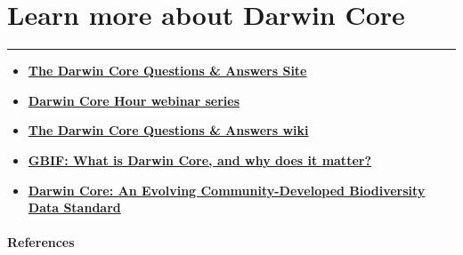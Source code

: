 \documentclass[]{book}
\theoremstyle{definition}
\theoremstyle{definition}
\theoremstyle{definition}
\theoremstyle{remark}
\begin{document}
\hypertarget{learn-more-about-darwin-core}{\chapter{Learn more about
Darwin Core}\label{learn-more-about-darwin-core}}

\begin{center}\rule{0.5\linewidth}{\linethickness}\end{center}

\begin{itemize}
\item
  \textbf{\href{https://github.com/tdwg/dwc-qa}{The Darwin Core
  Questions \& Answers Site}}
\item
  \textbf{\href{https://github.com/tdwg/dwc-qa/wiki/Webinars}{Darwin
  Core Hour webinar series}}
\item
  \textbf{\href{https://github.com/tdwg/dwc-qa/wiki}{The Darwin Core
  Questions \& Answers wiki}}
\item
  \textbf{\href{https://www.gbif.org/darwin-core}{GBIF: What is Darwin
  Core, and why does it matter?}}
\item
  \textbf{\href{https://doi.org/10.1371/journal.pone.0029715}{Darwin
  Core: An Evolving Community-Developed Biodiversity Data Standard}
  \citep{DwC-paper} }
\end{itemize}

\subsubsection*{References}\label{references-1}


\end{document}
